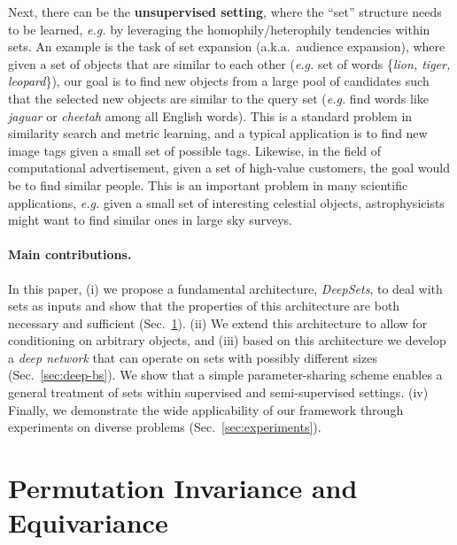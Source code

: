 \documentclass{article}
\newcommand{\refsec}[1]{Sec.~\ref{#1}}
\newcommand{\latinphrase}[1]{\emph{#1}}    %
\newcommand{\eg}{\latinphrase{e.g.}\xspace}
\newcommand{\aka}[0]{a.k.a.~}
\newcommand{\deepsets}{DeepSets\xspace}
\begin{document}
Next, there can be the \textbf{unsupervised setting}, where the ``set'' structure needs to be learned, \eg by leveraging the homophily/heterophily tendencies within sets.
An example is the task of set expansion (\aka audience expansion), where given a set of objects that are similar to each other (\eg set of words \{\textit{lion, tiger, leopard}\}), our goal is to find new objects from a large pool of candidates such that the selected new objects are similar to the query set (\eg find words like \textit{jaguar} or \textit{cheetah} among all English words). 
This is a standard problem in similarity search and metric learning, and a typical application is to find new image tags given a small set of possible tags. Likewise, in the field of computational advertisement, given a set of high-value customers, the goal would be to find similar people. This is an important problem in many scientific applications, \eg given a small set of interesting celestial objects, astrophysicists might want to find similar ones in large sky surveys.
 
\paragraph{Main contributions.}
In this paper, (i) we propose a fundamental architecture, \textit{\deepsets}, to deal with sets as inputs and show that the properties of this architecture are both necessary and sufficient (\refsec{sec:function-property}). (ii) We extend this architecture to allow for conditioning on arbitrary objects, and (iii) based on this architecture we develop a \emph{deep network} that can operate on sets with possibly different sizes (\refsec{sec:deep-bs}).
We show that a simple parameter-sharing scheme enables a general treatment of sets within supervised and semi-supervised settings. 
(iv) Finally, we demonstrate the wide applicability of our framework through experiments on diverse problems (\refsec{sec:experiments}).


\section{Permutation Invariance and Equivariance}
\label{sec:function-property}
\end{document}
